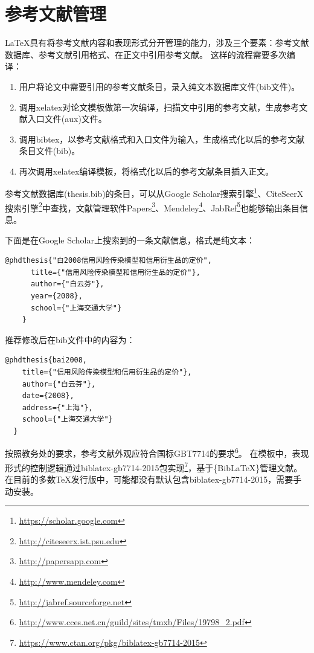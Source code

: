 \documentclass[doctor,openright,twoside]{sjtuthesis}
\theoremstyle{plain}
\theoremstyle{definition}
\theoremstyle{remark}
\theoremstyle{ocrenumbox}
\theoremstyle{plain}
\begin{document}
\section{参考文献管理}

\LaTeX 具有将参考文献内容和表现形式分开管理的能力，涉及三个要素：参考文献数据库、参考文献引用格式、在正文中引用参考文献。
这样的流程需要多次编译：

\begin{enumerate}[noitemsep,topsep=0pt,parsep=0pt,partopsep=0pt]
    \item 用户将论文中需要引用的参考文献条目，录入纯文本数据库文件(bib文件)。
    \item 调用xelatex对论文模板做第一次编译，扫描文中引用的参考文献，生成参考文献入口文件(aux)文件。
    \item 调用bibtex，以参考文献格式和入口文件为输入，生成格式化以后的参考文献条目文件(bib)。
    \item 再次调用xelatex编译模板，将格式化以后的参考文献条目插入正文。
\end{enumerate}

参考文献数据库(thesis.bib)的条目，可以从Google Scholar搜索引擎\footnote{\url{https://scholar.google.com}}、CiteSeerX搜索引擎\footnote{\url{http://citeseerx.ist.psu.edu}}中查找，文献管理软件Papers\footnote{\url{http://papersapp.com}}、Mendeley\footnote{\url{http://www.mendeley.com}}、JabRef\footnote{\url{http://jabref.sourceforge.net}}也能够输出条目信息。

下面是在Google Scholar上搜索到的一条文献信息，格式是纯文本：

\begin{lstlisting}[caption={从Google Scholar找到的参考文献条目}, label=googlescholar, escapeinside="", numbers=none]
    @phdthesis{"白2008信用风险传染模型和信用衍生品的定价",
      title={"信用风险传染模型和信用衍生品的定价"},
      author={"白云芬"},
      year={2008},
      school={"上海交通大学"}
    }
\end{lstlisting}

推荐修改后在bib文件中的内容为：

\begin{lstlisting}[caption={修改后的参考文献条目}, label=itemok, escapeinside="", numbers=none]
  @phdthesis{bai2008,
    title={"信用风险传染模型和信用衍生品的定价"},
    author={"白云芬"},
    date={2008},
    address={"上海"},
    school={"上海交通大学"}
  }
\end{lstlisting}

按照教务处的要求，参考文献外观应符合国标GBT7714的要求\footnote{\url{http://www.cces.net.cn/guild/sites/tmxb/Files/19798_2.pdf}}。
在模板中，表现形式的控制逻辑通过biblatex-gb7714-2015包实现\footnote{\url{https://www.ctan.org/pkg/biblatex-gb7714-2015}}，基于\{Bib\LaTeX\}管理文献。在目前的多数TeX发行版中，可能都没有默认包含biblatex-gb7714-2015，需要手动安装。
\end{document}
